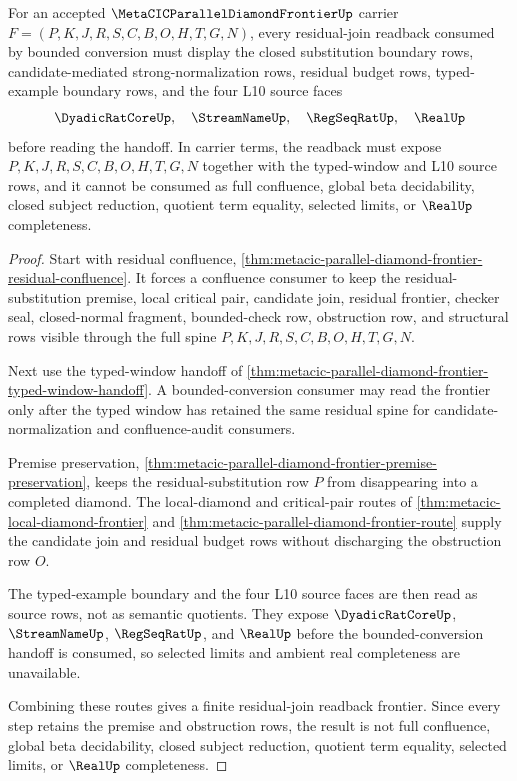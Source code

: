 \begin{theorem}
\label{thm:metacic-parallel-diamond-frontier-residual-join-readback}
For an accepted $\MetaCICParallelDiamondFrontierUp$ carrier $F=(P,K,J,R,S,C,B,O,H,T,G,N)$, every residual-join readback consumed by bounded conversion must display the closed substitution boundary rows, candidate-mediated strong-normalization rows, residual budget rows, typed-example boundary rows, and the four L10 source faces
$$
\DyadicRatCoreUp,\quad \StreamNameUp,\quad \RegSeqRatUp,\quad \RealUp
$$
before reading the handoff. In carrier terms, the readback must expose $P,K,J,R,S,C,B,O,H,T,G,N$ together with the typed-window and L10 source rows, and it cannot be consumed as full confluence, global beta decidability, closed subject reduction, quotient term equality, selected limits, or $\RealUp$ completeness.
\end{theorem}
\begin{proof}
Start with residual confluence, \autoref{thm:metacic-parallel-diamond-frontier-residual-confluence}. It forces a confluence consumer to keep the residual-substitution premise, local critical pair, candidate join, residual frontier, checker seal, closed-normal fragment, bounded-check row, obstruction row, and structural rows visible through the full spine $P,K,J,R,S,C,B,O,H,T,G,N$.

Next use the typed-window handoff of \autoref{thm:metacic-parallel-diamond-frontier-typed-window-handoff}. A bounded-conversion consumer may read the frontier only after the typed window has retained the same residual spine for candidate-normalization and confluence-audit consumers.

Premise preservation, \autoref{thm:metacic-parallel-diamond-frontier-premise-preservation}, keeps the residual-substitution row $P$ from disappearing into a completed diamond. The local-diamond and critical-pair routes of \autoref{thm:metacic-local-diamond-frontier} and \autoref{thm:metacic-parallel-diamond-frontier-route} supply the candidate join and residual budget rows without discharging the obstruction row $O$.

The typed-example boundary and the four L10 source faces are then read as source rows, not as semantic quotients. They expose $\DyadicRatCoreUp$, $\StreamNameUp$, $\RegSeqRatUp$, and $\RealUp$ before the bounded-conversion handoff is consumed, so selected limits and ambient real completeness are unavailable.

Combining these routes gives a finite residual-join readback frontier. Since every step retains the premise and obstruction rows, the result is not full confluence, global beta decidability, closed subject reduction, quotient term equality, selected limits, or $\RealUp$ completeness.
\end{proof}

